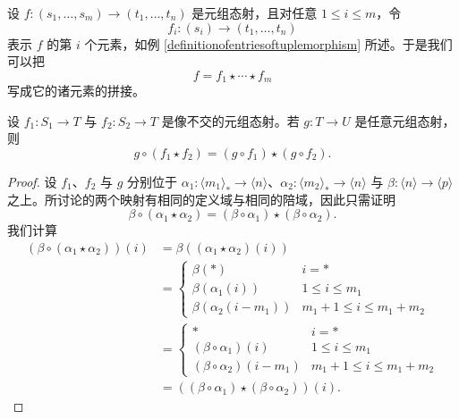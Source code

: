 \begin{example}
设 $f:(s_1,\dots,s_m) \to (t_1,\dots,t_n)$ 是元组态射，且对任意 $1 \leq i \leq m$，令 
\[f_i:(s_i) \to (t_1,\dots,t_n)\]
表示 $f$ 的第 $i$ 个元素，如例 \ref{definitionofentriesoftuplemorphism} 所述。于是我们可以把 
\[
f = f_1 \star \cdots \star f_m
\]
写成它的诸元素的拼接。
\end{example}

\begin{lemma}\label{compositiondistributesoverconcatenation}
    设 $f_1:S_1 \to T$ 与 $f_2: S_2 \to T$ 是像不交的元组态射。若 $g:T \to U$ 是任意元组态射，则
    \[
    g \circ (f_1 \star f_2) = (g \circ f_1) \star (g \circ f_2).
    \]
\end{lemma}

\begin{proof}
    设 $f_1$、$f_2$ 与 $g$ 分别位于 $\alpha_1:\langle m_1 \rangle_* \to \langle n \rangle$、$\alpha_2:\langle m_2 \rangle_* \to \langle n \rangle$ 与 $\beta: \langle n \rangle \to \langle p \rangle$ 之上。所讨论的两个映射有相同的定义域与相同的陪域，因此只需证明
    \[
    \beta \circ (\alpha_1 \star \alpha_2) = (\beta \circ \alpha_1) \star (\beta \circ \alpha_2). 
    \]
    我们计算 
    \begin{align*}
        (\beta \circ (\alpha_1 \star \alpha_2))(i) & = \beta((\alpha_1 \star \alpha_2)(i))\\
        & = \begin{cases} 
        \beta(*) & i = *\\
        \beta(\alpha_1(i)) & 1 \leq i \leq m_1 \\
        \beta (\alpha_2(i-m_1)) & m_1 + 1 \leq i \leq m_1 + m_2
        \end{cases}\\
        & = \begin{cases} 
        * & i = *\\
        (\beta\circ \alpha_1)(i) & 1 \leq i \leq m_1 \\
        (\beta \circ \alpha_2)(i-m_1) & m_1 + 1 \leq i \leq m_1 + m_2
        \end{cases}\\
        & = ((\beta \circ \alpha_1)\star (\beta \circ \alpha_2))(i).
    \end{align*}
\end{proof}

